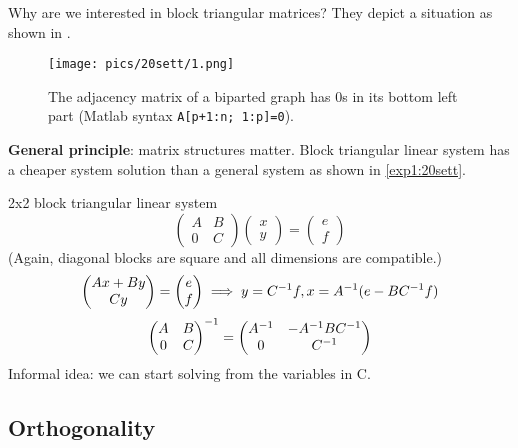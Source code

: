 \documentclass[computational_mathematics.tex]{subfiles}
\begin{document}
Why are we interested in block triangular matrices? They depict a situation as shown in .
\begin{figure}[H]
    \centering
    \texttt{[image: pics/20sett/1.png]}
    \caption{The adjacency matrix of a biparted graph has $0$s in its bottom left part (Matlab syntax \texttt{A[p+1:n; 1:p]=0}).}
    \label{fig:20sett3}
\end{figure}

\textbf{General principle}: matrix structures matter. Block triangular linear system has a cheaper system solution than a general system as shown in \cref{exp1:20sett}.
\begin{example}
\label{exp1:20sett}
2x2 block triangular linear system\\
$$
\begin{pmatrix}
    A & B\\
    0 & C
\end{pmatrix}
\begin{pmatrix}
    x \\
    y 
\end{pmatrix} = 
\begin{pmatrix}
    e \\
    f 
\end{pmatrix}
$$
(Again, diagonal blocks are square and all dimensions are
compatible.)
$$
\begin{pmatrix}
    Ax + By\\
    Cy
\end{pmatrix} = 
\begin{pmatrix}
    e \\
    f 
\end{pmatrix}\implies y = {C}^{-1}f, x = {A}^{-1}(e - B{C}^{-1}f)
$$
$$
\begin{pmatrix}
    A & B\\
    0 & C
\end{pmatrix}^{-1} = 
\begin{pmatrix}
          {A}^{-1} & -{A}^{-1}B{C}^{-1}\\
          0 & {C}^{-1}
        \end{pmatrix}
$$
Informal idea: we can start solving from the variables in C.
\end{example}

\subsection{Orthogonality}
\end{document}
